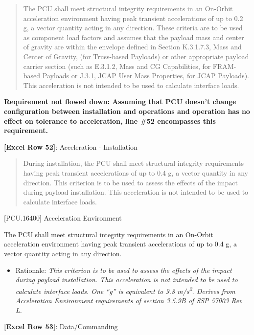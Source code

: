 \begin{quote}
The PCU shall meet structural integrity requirements in an On-Orbit acceleration environment having peak transient accelerations of up to 0.2 g, a vector quantity acting in any direction. These criteria are to be used as component load factors and assumes that the payload mass and center of gravity are within the envelope defined in Section K.3.1.7.3, Mass and Center of Gravity, (for Truss-based Payloads) or other appropriate payload carrier section (such as E.3.1.2, Mass and CG Capabilities, for FRAM-based Payloads or J.3.1, JCAP User Mass Properties, for JCAP Payloads). This acceleration is not intended to be used to calculate interface loads.
\end{quote}

\textbf{Requirement not flowed down: Assuming that PCU doesn't change configuration between installation and operations and operation has no effect on tolerance to acceleration, line \#52 encompasses this requirement.}

\textbf{[Excel Row 52]}: Acceleration - Installation

\begin{quote}
During installation, the PCU shall meet structural integrity requirements having peak transient accelerations of up to 0.4 g, a vector quantity in any direction. This criterion is to be used to assess the effects of the impact during payload installation. This acceleration is not intended to be used to calculate interface loads.
\end{quote}

[PCU.16400] Acceleration Environment

The PCU shall meet structural integrity requirements in an On-Orbit acceleration environment having peak transient accelerations of up to 0.4 g, a vector quantity acting in any direction.

\begin{itemize}
\item{} Rationale: \emph{This criterion is to be used to assess the effects of the impact during payload installation. This acceleration is not intended to be used to calculate interface loads. One ``g'' is equivalent to 9.8 m\slash s\textsuperscript{2}. Derives from Acceleration Environment requirements of section 3.5.9B of SSP 57003 Rev L.}

\end{itemize}

\textbf{[Excel Row 53]}: Data\slash Commanding

